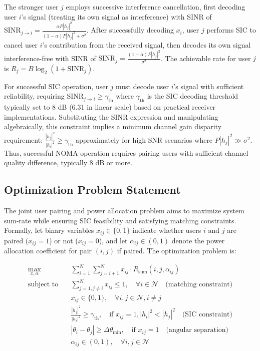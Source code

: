 The stronger user $j$ employs successive interference cancellation, first decoding user $i$'s signal (treating its own signal as interference) with SINR of $\text{SINR}_{j \to i} = \frac{\alpha P |h_j|^2}{(1-\alpha) P |h_j|^2 + \sigma^2}$. After successfully decoding $x_i$, user $j$ performs SIC to cancel user $i$'s contribution from the received signal, then decodes its own signal interference-free with SINR of $\text{SINR}_j = \frac{(1-\alpha) P |h_j|^2}{\sigma^2}$. The achievable rate for user $j$ is $R_j = B \log_2(1 + \text{SINR}_j)$.

For successful SIC operation, user $j$ must decode user $i$'s signal with sufficient reliability, requiring $\text{SINR}_{j \to i} \geq \gamma_{\text{th}}$ where $\gamma_{\text{th}}$ is the SIC decoding threshold typically set to 8 dB (6.31 in linear scale) based on practical receiver implementations. Substituting the SINR expression and manipulating algebraically, this constraint implies a minimum channel gain disparity requirement: $\frac{|h_j|^2}{|h_i|^2} \geq \gamma_{\text{th}}$ approximately for high SNR scenarios where $P|h_j|^2 \gg \sigma^2$. Thus, successful NOMA operation requires pairing users with sufficient channel quality difference, typically 8 dB or more.

\subsection{Optimization Problem Statement}

The joint user pairing and power allocation problem aims to maximize system sum-rate while ensuring SIC feasibility and satisfying matching constraints. Formally, let binary variables $x_{ij} \in \{0,1\}$ indicate whether users $i$ and $j$ are paired ($x_{ij} = 1$) or not ($x_{ij} = 0$), and let $\alpha_{ij} \in (0,1)$ denote the power allocation coefficient for pair $(i,j)$ if paired. The optimization problem is:

\begin{equation}
\begin{aligned}
\max_{x, \alpha} \quad & \sum_{i=1}^{N} \sum_{j=i+1}^{N} x_{ij} \cdot R_{\text{sum}}(i, j, \alpha_{ij}) \\
\text{subject to} \quad & \sum_{j=1, j \neq i}^{N} x_{ij} \leq 1, \quad \forall i \in \mathcal{N} \quad \text{(matching constraint)} \\
& x_{ij} \in \{0, 1\}, \quad \forall i, j \in \mathcal{N}, i \neq j \\
& \frac{|h_j|^2}{|h_i|^2} \geq \gamma_{\text{th}}, \quad \text{if } x_{ij} = 1, |h_i|^2 < |h_j|^2 \quad \text{(SIC constraint)} \\
& |\theta_i - \theta_j| \geq \Delta\theta_{\min}, \quad \text{if } x_{ij} = 1 \quad \text{(angular separation)} \\
& \alpha_{ij} \in (0, 1), \quad \forall i, j \in \mathcal{N}
\end{aligned}
\end{equation}

